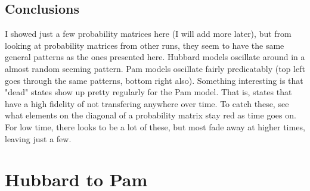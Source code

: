 \subsection{Conclusions}
I showed just a few probability matrices here (I will add more later), but from looking at probability matrices from other runs, they seem to have the same general patterns as the ones presented here.
Hubbard models oscillate around in a almost random seeming pattern.
Pam models oscillate fairly predicatably (top left goes through the same patterns, bottom right also).
Something interesting is that "dead" states show up pretty regularly for the Pam model.
That is, states that have a high fidelity of not transfering anywhere over time.
To catch these, see what elements on the diagonal of a probability matrix stay red as time goes on.
For low time, there looks to be a lot of these, but most fade away at higher times, leaving just a few.





\section{Hubbard to Pam}
